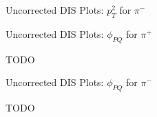\begin{frame}{Uncorrected DIS Plots: $p_T^2$ for $\pi^-$}
    \label{20.10f::pt2_pi-}

    \begin{figure}[t]
    \end{figure}

\end{frame}

\begin{frame}{Uncorrected DIS Plots: $\phi_{PQ}$ for $\pi^+$}
    \label{20.10g::phipq_pi+}

    TODO

\end{frame}

\begin{frame}{Uncorrected DIS Plots: $\phi_{PQ}$ for $\pi^-$}
    \label{20.10h::phipq_pi-}

    TODO

\end{frame}
